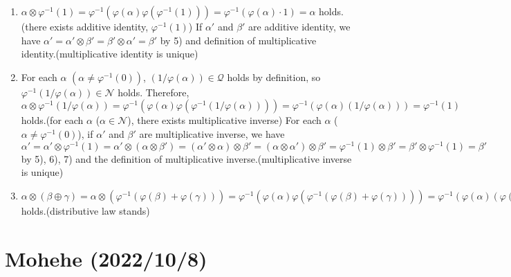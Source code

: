 \documentclass{article}
\theoremstyle{thmstyleone}
\theoremstyle{thmstyletwo}
\theoremstyle{thmstylethree}
\newcommand\N{\mathcal N}
\newcommand\Q{\mathcal Q}
\begin{document}
\begin{enumerate}[label = (\alph*)]
\begin{enumerate}[label = \arabic*)]
      \item $\alpha \otimes \varphi^{-1}(1) = \varphi^{-1}(\varphi(\alpha)\varphi(\varphi^{-1}(1))) = \varphi^{-1}(\varphi(\alpha)\cdot1) = \alpha$ holds.(there exists additive identity, $\varphi^{-1}(1)$)
        If $\alpha'$ and $\beta'$ are additive identity, we have $\alpha' = \alpha' \otimes \beta' = \beta' \otimes \alpha' = \beta'$ by 5) and definition of multiplicative identity.(multiplicative identity is unique)
      \item For each $\alpha$ $(\alpha \neq \varphi^{-1}(0))$, $(1/\varphi(\alpha))\in\Q$ holds by definition, so $\varphi^{-1}(1/\varphi(\alpha)) \in \N$ holds. Therefore, $\alpha \otimes \varphi^{-1}(1/\varphi(\alpha)) = \varphi^{-1}(\varphi(\alpha)\varphi(\varphi^{-1}(1/\varphi(\alpha)))) = \varphi^{-1}(\varphi(\alpha)(1/\varphi(\alpha))) = \varphi^{-1}(1)$ holds.(for each $\alpha$ ($\alpha \in \N$), there exists multiplicative inverse)
        For each $\alpha$ ($\alpha \neq \varphi^{-1}(0)$), if $\alpha'$ and $\beta'$ are multiplicative inverse, we have $\alpha' = \alpha' \otimes \varphi^{-1}(1) = \alpha' \otimes (\alpha \otimes \beta') = (\alpha' \otimes \alpha) \otimes \beta' = (\alpha \otimes \alpha') \otimes \beta' = \varphi^{-1}(1) \otimes \beta' = \beta' \otimes \varphi^{-1}(1) = \beta'$ by 5), 6), 7) and the definition of multiplicative inverse.(multiplicative inverse is unique) 
      \item $\alpha \otimes (\beta \oplus \gamma) = \alpha \otimes (\varphi^{-1}(\varphi(\beta) + \varphi(\gamma))) = \varphi^{-1}(\varphi(\alpha)\varphi(\varphi^{-1}(\varphi(\beta) + \varphi(\gamma)))) = \varphi^{-1}(\varphi(\alpha)(\varphi(\beta) + \varphi(\gamma))) = \varphi^{-1}(\varphi(\alpha)\varphi(\beta) + \varphi(\alpha)\varphi(\gamma)) = \varphi^{-1}(\varphi(\varphi^{-1}(\varphi(\alpha)\varphi(\beta))) + \varphi(\varphi^{-1}(\varphi(\alpha)\varphi(\gamma)))) = \varphi^{-1}(\varphi(\alpha \otimes \beta) + \varphi(\alpha \otimes \gamma)) = \alpha \otimes \beta \oplus \alpha \otimes \gamma$ holds.(distributive law stands)
    \end{enumerate}
\end{enumerate}

\section{Mohehe (2022/10/8)}
\end{document}
